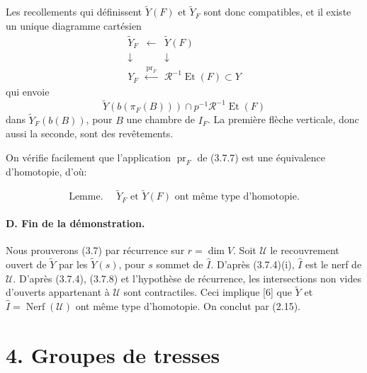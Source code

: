 \documentclass[10pt]{article}
\begin{document}
Les recollements qui définissent \(\widetilde Y(F)\) et \(\widetilde Y_F\) sont donc compatibles, et il existe un unique diagramme cartésien
\[
\tag{3.7.7}
\begin{array}{ccc}
\widetilde Y_F&\longleftarrow&\widetilde Y(F)\\
\downarrow&&\downarrow\\
Y_F&\xleftarrow{\operatorname{pr}_F}&\mathcal R^{-1}\operatorname{Et}(F)\subset Y
\end{array}
\]
qui envoie
\[
\widetilde Y(b(\pi_F(B)))\cap p^{-1}\mathcal R^{-1}\operatorname{Et}(F)
\]
dans \(\widetilde Y_F(b(B))\), pour \(B\) une chambre de \(I_F\). La première flèche verticale, donc aussi la seconde, sont des revêtements.

On vérifie facilement que l'application \(\operatorname{pr}_F\) de (3.7.7) est une équivalence d'homotopie, d'où:

\[
\tag{3.7.8}
\text{Lemme. }\quad
\widetilde Y_F\text{ et }\widetilde Y(F)\text{ ont même type d'homotopie.}
\]

\paragraph{D. Fin de la démonstration.} Nous prouverons (3.7) par récurrence sur \(r=\dim V\). Soit \(\mathcal U\) le recouvrement ouvert de \(\widetilde Y\) par les \(\widetilde Y(s)\), pour \(s\) sommet de \(\widehat I\). D'après (3.7.4)(i), \(\widehat I\) est le nerf de \(\mathcal U\). D'après (3.7.4), (3.7.8) et l'hypothèse de récurrence, les intersections non vides d'ouverts appartenant à \(\mathcal U\) sont contractiles. Ceci implique [6] que \(\widetilde Y\) et \(\widehat I=\operatorname{Nerf}(\mathcal U)\) ont même type d'homotopie. On conclut par (2.15).

\section*{4. Groupes de tresses}
\end{document}
